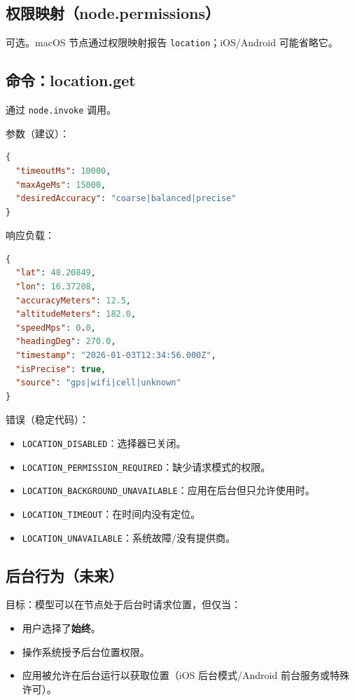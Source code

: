 \subsection{权限映射（node.permissions）}


可选。macOS 节点通过权限映射报告 \texttt{location}；iOS/Android 可能省略它。

\subsection{命令：location.get}


通过 \texttt{node.invoke} 调用。

参数（建议）：

\begin{lstlisting}[language=json]
{
  "timeoutMs": 10000,
  "maxAgeMs": 15000,
  "desiredAccuracy": "coarse|balanced|precise"
}
\end{lstlisting}


响应负载：

\begin{lstlisting}[language=json]
{
  "lat": 48.20849,
  "lon": 16.37208,
  "accuracyMeters": 12.5,
  "altitudeMeters": 182.0,
  "speedMps": 0.0,
  "headingDeg": 270.0,
  "timestamp": "2026-01-03T12:34:56.000Z",
  "isPrecise": true,
  "source": "gps|wifi|cell|unknown"
}
\end{lstlisting}


错误（稳定代码）：

\begin{itemize}
  \item \texttt{LOCATION\_DISABLED}：选择器已关闭。
  \item \texttt{LOCATION\_PERMISSION\_REQUIRED}：缺少请求模式的权限。
  \item \texttt{LOCATION\_BACKGROUND\_UNAVAILABLE}：应用在后台但只允许使用时。
  \item \texttt{LOCATION\_TIMEOUT}：在时间内没有定位。
  \item \texttt{LOCATION\_UNAVAILABLE}：系统故障/没有提供商。
\end{itemize}


\subsection{后台行为（未来）}


目标：模型可以在节点处于后台时请求位置，但仅当：

\begin{itemize}
  \item 用户选择了\textbf{始终}。
  \item 操作系统授予后台位置权限。
  \item 应用被允许在后台运行以获取位置（iOS 后台模式/Android 前台服务或特殊许可）。
\end{itemize}


